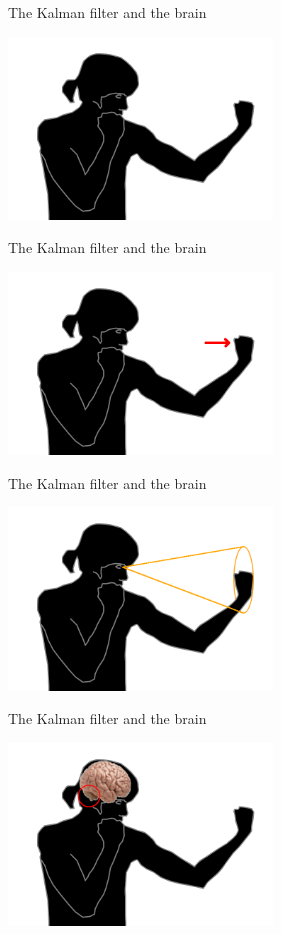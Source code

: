 \documentclass{beamer}
\begin{document}
\begin{frame}{The Kalman filter and the brain}
  \begin{center}
    \includegraphics[width=7cm]{boxing1.png}
  \end{center}
\end{frame}


\begin{frame}{The Kalman filter and the brain}
  \begin{center}
    \includegraphics[width=7cm]{boxing2.png}
  \end{center}
\end{frame}


\begin{frame}{The Kalman filter and the brain}
  \begin{center}
    \includegraphics[width=7cm]{boxing3.png}
  \end{center}
\end{frame}


\begin{frame}{The Kalman filter and the brain}
  \begin{center}
    \includegraphics[width=7cm]{boxing4.png}
  \end{center}
\end{frame}
\end{document}
